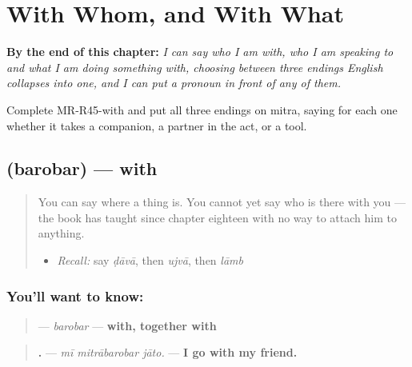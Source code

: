 
\chapter{With Whom, and With What}
\label{ch:mr-with}

\begin{chapteropening}
\textbf{By the end of this chapter:} \emph{I can say who I am with, who I am speaking to and what I am doing something with, choosing between three endings English collapses into one, and I can put a pronoun in front of any of them.}

Complete MR-R45-with and put all three endings on mitra, saying for each one whether it takes a companion, a partner in the act, or a tool.
\end{chapteropening}

\section[\texorpdfstring{\mr{बरोबर} (barobar)}{बरोबर (barobar)}]{ (barobar) — with}

\label{lesson:MR-C45-barobar}



\begin{quote}
You can say where a thing is. You cannot yet say who is there with you — the book has taught \textbf{} since chapter eighteen with no way to attach him to anything.

\begin{itemize}
\raggedright
  \item \emph{Recall:} say \emph{ḍāvā}, then \emph{ujvā}, then \emph{lāmb}
\end{itemize}
\end{quote}

\subsection*{You'll want to know: }
\begin{quote}
\textbf{} — \emph{barobar} — \textbf{with, together with}
\end{quote}

\begin{quote}
\textbf{  .} — \emph{mī mitrābarobar jāto.} — \textbf{I go with my friend.}
\end{quote}

